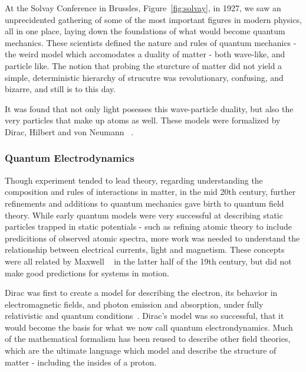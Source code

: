 At the Solvay Conference in Brussles, Figure~\ref{fig:solvay}, in 1927, we saw
an unprecidented gathering of some of the most important figures in modern
physics, all in one place, laying down the foundations of what would become
quantum mechanics. These scientists defined the nature and rules of quantum
mechanics - the weird model which accomodates a duality of matter - both
wave-like, and particle like. The notion that probing the sturcture of matter
did not yield a simple, deterministic hierarchy of strucutre was revolutionary,
confusing, and bizarre, and still is to this day.

It was found that not only light posesses this wave-particle duality, but also
the very particles that make up atoms as well. These models were formalized by
Dirac, Hilbert and von Neumann ~\needcite{}.

\subsubsection{Quantum Electrodynamics}

Though experiment tended to lead theory, regarding understanding the composition
and rules of interactions in matter, in the mid 20th century, further
refinements and additions to quantum mechanics gave birth to quantum field
theory. While early quantum models were very successful at describing static
particles trapped in static potentials - such as refining atomic theory to
include predicitions of observed atomic spectra, more work was needed to
understand the relationship between electrical currents, light and magnetism.
These concepts were all related by Maxwell ~\needcite{} in the latter half of
the 19th century, but did not make good predictions for systems in motion.

Dirac was first to create a model for describing the electron, its behavior in
electromagnetic fields, and photon emission and absorption, under fully
relativistic and quantum conditions~\needcite{}. Dirac's model was so
successful, that it would become the basis for what we now call quantum
electrondynamics. Much of the mathematical formalism has been reused to describe
other field theories, which are the ultimate language which model and describe
the structure of matter - including the insides of a proton. 

